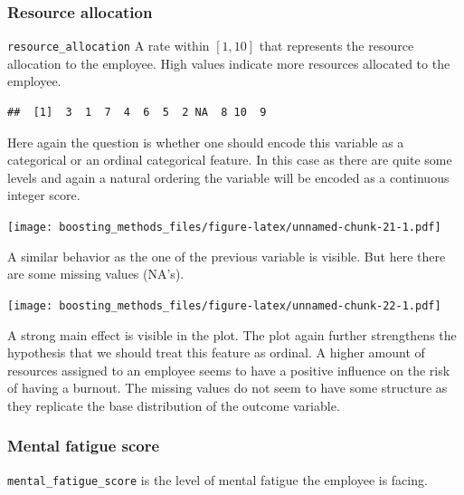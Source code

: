 \documentclass[
]{book}
\newenvironment{Shaded}{\begin{snugshade}}{\end{snugshade}}
\newcommand{\CommentTok}[1]{\textcolor[rgb]{0.56,0.35,0.01}{\textit{#1}}}
\newcommand{\FunctionTok}[1]{\textcolor[rgb]{0.00,0.00,0.00}{#1}}
\newcommand{\NormalTok}[1]{#1}
\newcommand{\SpecialCharTok}[1]{\textcolor[rgb]{0.00,0.00,0.00}{#1}}
\begin{document}
\hypertarget{resource-allocation}{%
\subsubsection{Resource allocation}\label{resource-allocation}}

\texttt{resource\_allocation} A rate within \([1,10]\) that represents the resource allocation to the employee. High values indicate more resources allocated to the employee.

\begin{Shaded}
\end{Shaded}

\begin{verbatim}
##  [1]  3  1  7  4  6  5  2 NA  8 10  9
\end{verbatim}

Here again the question is whether one should encode this variable as a categorical or an ordinal categorical feature. In this case as there are quite some levels and again a natural ordering the variable will be encoded as a continuous integer score.

\texttt{[image: boosting\_methods\_files/figure-latex/unnamed-chunk-21-1.pdf]}

A similar behavior as the one of the previous variable is visible. But here there are some missing values (NA's).

\texttt{[image: boosting\_methods\_files/figure-latex/unnamed-chunk-22-1.pdf]}

A strong main effect is visible in the plot. The plot again further strengthens the hypothesis that we should treat this feature as ordinal. A higher amount of resources assigned to an employee seems to have a positive influence on the risk of having a burnout. The missing values do not seem to have some structure as they replicate the base distribution of the outcome variable.

\hypertarget{mental-fatigue-score}{%
\subsubsection{Mental fatigue score}\label{mental-fatigue-score}}

\texttt{mental\_fatigue\_score} is the level of mental fatigue the employee is facing.
\end{document}
